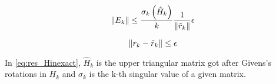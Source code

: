     \begin{equation}\label{eq:res_Hinexact}
        \left\lVert E_{k}\right\rVert \leq \frac{\sigma_{k} \left( \hat{H}_{k} \right) }{k} \frac{1}{\left\lVert\tilde{r}_{k}\right\rVert} \epsilon
    \end{equation}

    \begin{equation}\label{eq:res_igmres}
        \left\lVert r_{k}-\tilde{r}_{k}\right\rVert \leq \epsilon
    \end{equation}

    In \ref{eq:res_Hinexact}, $\hat{H}_{k}$ is the upper triangular matrix got after Givens's rotations in $H_{k}$ and $\sigma_{k}$ is the k-th singular value of a given matrix.